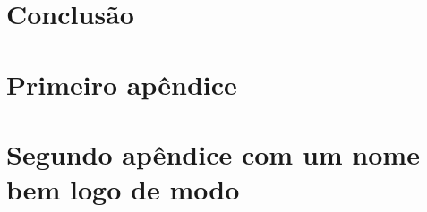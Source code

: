 \documentclass[12pt,openright,twoside,a4paper]{abntex2}
\begin{document}
\chapter*{Conclusão}

\lipsum[31-33]




%
%


\begin{apendicesenv}

\appendixpage

\chapter{Primeiro apêndice}

\lipsum[50-52]

\chapter{Segundo apêndice com um nome bem logo de modo}
\lipsum[55-57]
\end{apendicesenv}
\end{document}
